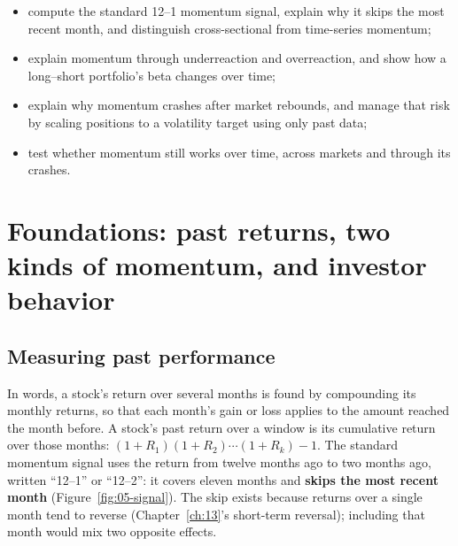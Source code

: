 \begin{itemize}
  \item compute the standard 12--1 momentum signal, explain why it skips the most recent month, and distinguish cross-sectional from time-series momentum;
  \item explain momentum through underreaction and overreaction, and show how a long--short portfolio's beta changes over time;
  \item explain why momentum crashes after market rebounds, and manage that risk by scaling positions to a volatility target using only past data;
  \item test whether momentum still works over time, across markets and through its crashes.
\end{itemize}



\section{Foundations: past returns, two kinds of momentum, and investor behavior}
\label{sec:05-foundations}

\subsection{Measuring past performance}

In words, a stock's return over several months is found by compounding its monthly returns, so that each month's gain or loss applies to the amount reached the month before. A stock's past return over a window is its cumulative return over those months: $(1 + R_1)(1 + R_2)\cdots(1 + R_k) - 1$. The standard momentum signal uses the return from twelve months ago to two months ago, written ``12--1'' or ``12--2'': it covers eleven months and \textbf{skips the most recent month} (Figure~\ref{fig:05-signal}). The skip exists because returns over a single month tend to reverse (Chapter~\ref{ch:13}'s short-term reversal); including that month would mix two opposite effects.

